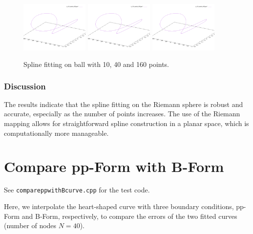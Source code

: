\documentclass{article}
\begin{document}
\begin{figure}[H]
    \centering
    \includegraphics[width=0.3\textwidth]{../figure/B1r3spline_ball_10.png}
    \includegraphics[width=0.3\textwidth]{../figure/B1r3spline_ball_10.png}
    \includegraphics[width=0.3\textwidth]{../figure/B1r3spline_ball_10.png}
    \caption{Spline fitting on ball with 10, 40 and 160 points.}
    \label{fig:ball}
\end{figure}

\subsubsection{Discussion}
The results indicate that the spline fitting on the Riemann sphere is robust and accurate, especially as the number of points increases. The use of the Riemann mapping allows for straightforward spline construction in a planar space, which is computationally more manageable.


\section{Compare pp-Form with B-Form}
See \texttt{compareppwithBcurve.cpp} for the test code.\par
Here, we interpolate the heart-shaped curve with three boundary conditions, pp-Form and B-Form, respectively, to compare the errors of the two fitted curves (number of nodes \(N=40\)).
\end{document}
